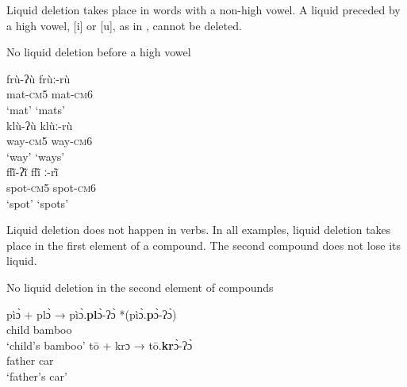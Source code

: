 \documentclass[output=paper]{langscibook}
\begin{document}
Liquid deletion takes place in words with a non-high vowel. A liquid preceded by a high vowel, [i] or [u], as in , cannot be deleted. 

\begin{exe}\setlength{\multicolsep}{0pt}
    \ex  No liquid deletion before a high vowel  \label{ex:traore:31}\\
    \begin{multicols}{3}\raggedcolumns
    \begin{xlist}
        \ex  \glll frù-ʔù         frùː-rù\\
              mat-\textsc{cm}5    mat-\textsc{cm}6\\
              `mat' `mats'\\
        \columnbreak\ex \glll klù-ʔù          klùː-rù\\
        way-\textsc{cm}5      way-\textsc{cm}6\\
        `way' `ways'\\
        \columnbreak\ex \glll   flĩ̀-ʔĩ̀   {flĩ̀ ː-rĩ̀ }\\
        spot-\textsc{cm}5      spot-\textsc{cm}6\\
        `spot' `spots'\\
    \end{xlist}\end{multicols}\end{exe}

Liquid deletion does not happen in verbs.
In all examples, liquid deletion takes place in the first element of a compound. The second compound does not lose its liquid.

\begin{exe}
  \ex No liquid deletion in the second element of compounds\label{ex:traore:32}\\
  \begin{xlist}
    \ex \gll pìɔ̀      +          plɔ̀                           →            pìɔ̀.\textbf{pl}ɔ̀-ʔɔ̀    *(pìɔ̀.\textbf{p}ɔ̀-ʔɔ̀)\\
    child               {}    bamboo                           {}         {}  {}\\
    \trans ‘child’s bamboo’  
    \ex  \gll tō            +          krɔ                           →            tō.\textbf{kr}ɔ̀-ʔɔ̀  \\            father         {}       car                            {}            {}\\
    \trans ‘father’s car’
    \end{xlist}
 \end{exe}
\end{document}
